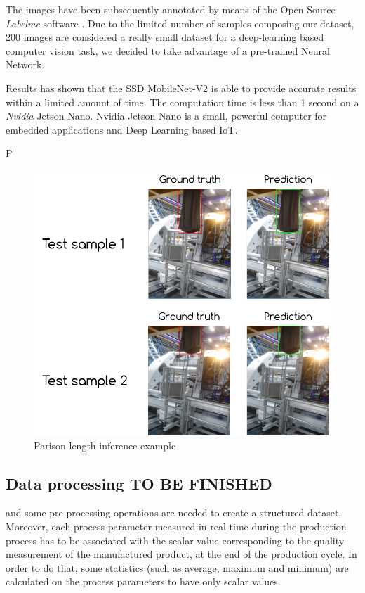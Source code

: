 The images have been subsequently annotated by means of the Open Source \textit{Labelme} software \citep{wada2016labelme}. Due to the limited number of samples composing our dataset, 200 images are considered a really small dataset for a deep-learning based computer vision task, we decided to take advantage of a pre-trained Neural Network.





Results has shown that the SSD MobileNet-V2 is able to provide accurate results within a limited amount of time. The computation time is less than 1 second on a \textit{Nvidia} Jetson Nano. Nvidia Jetson Nano is a small, powerful computer for embedded applications and Deep Learning based IoT.

P

\begin{figure}
\centerline{\includegraphics[scale=0.8]{images/chapter_3/parison_length_gt_prediction.png}}
\caption{Parison length inference example}
\label{fig:parison_inference}
\end{figure}

\subsection{Data processing TO BE FINISHED}


and some pre-processing operations are needed to create a structured dataset.  Moreover, each process parameter measured in real-time during the production process has to be associated with the scalar value corresponding to the quality measurement of the manufactured product, at the end of the production cycle. In order to do that, some statistics (such as average, maximum and minimum) are calculated on the process parameters to have only scalar values.

